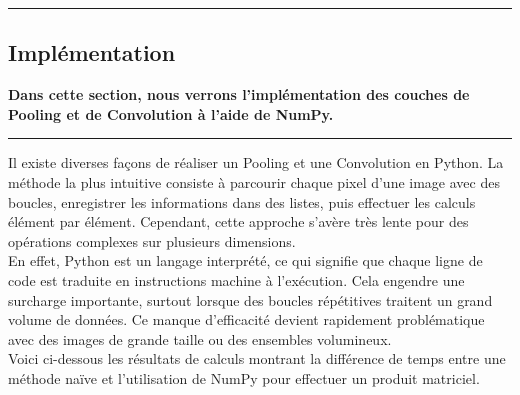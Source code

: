 {\color{gray}\hrule}
\begin{center}
\section{Implémentation}
\textbf{Dans cette section, nous verrons l'implémentation des couches de 
Pooling et de Convolution à l'aide de NumPy.}
\bigskip
\end{center}
{\color{gray}\hrule}
\begin{multicols}{2}

Il existe diverses façons de réaliser un Pooling et une Convolution
en Python. La méthode la plus intuitive consiste à parcourir chaque pixel d’une
image avec des boucles, enregistrer les informations dans des listes, puis
effectuer les calculs élément par élément. Cependant, cette approche
s’avère très lente pour des opérations complexes sur plusieurs dimensions. \\

En effet, Python est un langage interprété, ce qui signifie que chaque
ligne de code est traduite en instructions machine à l’exécution.
Cela engendre une surcharge importante, surtout lorsque des boucles répétitives
traitent un grand volume de données. Ce manque d’efficacité devient rapidement problématique
avec des images de grande taille ou des ensembles volumineux. \\

Voici ci-dessous les résultats de calculs montrant la différence de temps entre une
méthode naïve et l’utilisation de NumPy pour effectuer un produit matriciel.\\

\renewcommand{\arraystretch}{1.5}

\\



\end{multicols}
